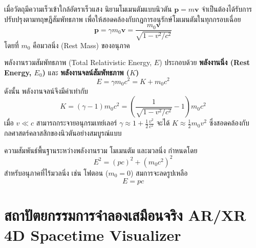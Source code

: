 เมื่อวัตถุมีความเร็วเข้าใกล้อัตราเร็วแสง นิยามโมเมนตัมแบบนิวตัน $\mathbf{p} = m\mathbf{v}$ จำเป็นต้องได้รับการปรับปรุงตามทฤษฎีสัมพัทธภาพ เพื่อให้สอดคล้องกับกฎการอนุรักษ์โมเมนตัมในทุกกรอบเฉื่อย
\begin{equation}
\mathbf{p} = \gamma m_0 \mathbf{v} = \frac{m_0 \mathbf{v}}{\sqrt{1 - v^2/c^2}}
\end{equation}
โดยที่ $m_0$ คือมวลนิ่ง (Rest Mass) ของอนุภาค

พลังงานรวมสัมพัทธภาพ (Total Relativistic Energy, $E$) ประกอบด้วย \textbf{\mbox{พลังงานนิ่ง} (Rest Energy, $E_0$)} และ \textbf{พลังงานจลน์สัมพัทธภาพ ($K$)}
\begin{equation}
E = \gamma m_0 c^2 = K + m_0 c^2
\end{equation}
ดังนั้น พลังงานจลน์จึงมีค่าเท่ากับ
\begin{equation}
K = (\gamma - 1) m_0 c^2 = \left( \frac{1}{\sqrt{1 - v^2/c^2}} - 1 \right) m_0 c^2
\end{equation}
เมื่อ $v \ll c$ สามารถกระจายอนุกรมเทย์เลอร์ $\gamma \approx 1 + \frac{1}{2}\frac{v^2}{c^2}$ จะได้ $K \approx \frac{1}{2}m_0 v^2$ ซึ่งสอดคล้องกับกลศาสตร์คลาสสิกของนิวตันอย่างสมบูรณ์แบบ

ความสัมพันธ์พื้นฐานระหว่างพลังงานรวม โมเมนตัม และมวลนิ่ง กำหนดโดย
\begin{equation}
E^2 = (pc)^2 + (m_0 c^2)^2
\end{equation}
สำหรับอนุภาคที่ไร้มวลนิ่ง เช่น โฟตอน ($m_0 = 0$) สมการจะลดรูปเหลือ
\begin{equation}
E = pc
\end{equation}

\section{สถาปัตยกรรมการจำลองเสมือนจริง AR/XR 4D Spacetime Visualizer}

